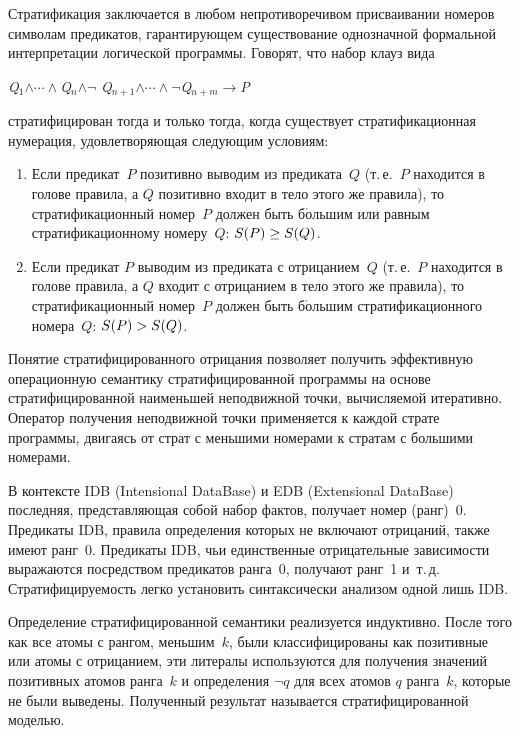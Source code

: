 \begin{multicols}{2}
Стратификация заключается в любом непротиворечивом присваивании номеров символам 
предикатов, гарантирующем существование однозначной формальной интерпретации 
логической програм\-мы. Говорят, что набор клауз вида 

\begin{center}
\textit{Q}$_1$\;$\land \cdots \land$\;\textit{Q}$_n$\;$\land \neg$\; 
\textit{Q}$_{n+1}$\;$\land \cdots \land\neg $\;\textit{Q}$_{n+m}$\;$\rightarrow$\;\textit{P}
\end{center}
 
\noindent
стратифицирован тогда и только тогда, 
когда существует стратификационная нумерация, удовлетворяющая следующим условиям:
\begin{enumerate}
\item Если предикат~$P$ позитивно выводим из предиката~$Q$ (т.\,е.\ $P$ находится в голове правила, а 
$Q$ позитивно входит в тело этого же правила), то стратификационный номер~$P$ должен быть 
б$\acute{\mbox{о}}$льшим 
или равным стратификационному номеру~$Q$: $S(P) \hm \geq S(Q)$.
\item Если предикат $P$ выводим из предиката с отрицанием~$Q$ (т.\,е.\ $P$ находится в голове правила, а 
$Q$ входит с отрицанием в тело этого же правила), то стратификационный номер~$P$ должен быть 
б$\acute{\mbox{о}}$льшим стратификационного номера~$Q$: $S(P) \hm> S(Q)$.
\end{enumerate}

Понятие стратифицированного отрицания позволяет получить эффективную 
операционную семантику стратифицированной программы на основе стратифицированной 
наименьшей неподвижной точки, вычисляемой итеративно. Оператор получения 
неподвижной точки применяется к каждой страте программы, двигаясь от страт с 
меньшими номерами к стратам с большими номерами.

В контексте IDB (Intensional DataBase) и EDB (Extensional DataBase)
последняя, представляющая собой набор фактов, получает номер 
(ранг)~0. Предикаты IDB, правила определения которых не включают отрицаний, также 
имеют ранг~0. Предикаты IDB, чьи единственные отрицательные зависимости выражаются 
посредством предикатов ранга~0, получают ранг~1 и~т.\,д. Стратифицируемость легко 
установить синтаксически анализом одной лишь IDB. 

Определение стратифицированной 
семантики реализуется индуктивно. После того как все атомы с рангом, меньшим~$k$, были 
классифицированы как позитивные или атомы с отрицанием, эти литералы используются 
для получения значений позитивных атомов ранга~$k$ и определения $\lnot q$ для всех 
атомов $q$ ранга~$k$, которые не были выведены. Полученный результат называется 
стратифицированной мо\-делью.


\end{multicols}

